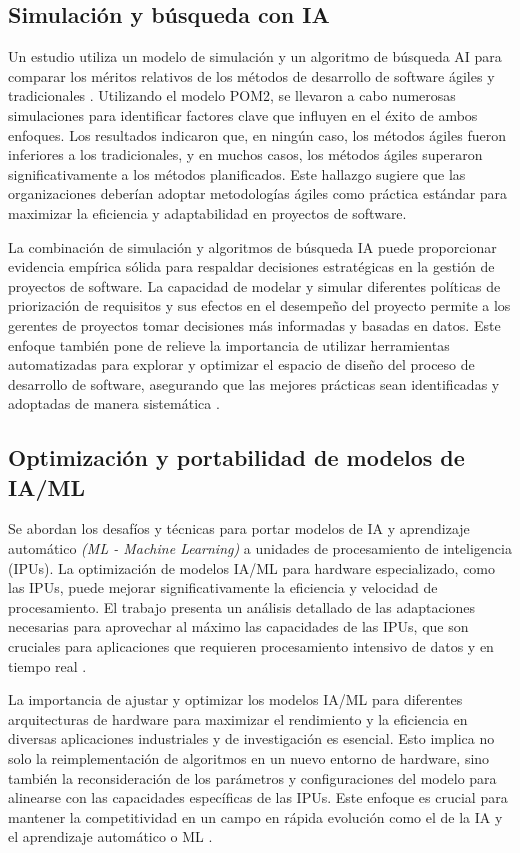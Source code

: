 \subsection{Simulación y búsqueda con IA}

Un estudio utiliza un modelo de simulación y un algoritmo de búsqueda AI para comparar los méritos relativos de los métodos de desarrollo de software ágiles y tradicionales \cite{Lemon2009}. Utilizando el modelo POM2, se llevaron a cabo numerosas simulaciones para identificar factores clave que influyen en el éxito de ambos enfoques. Los resultados indicaron que, en ningún caso, los métodos ágiles fueron inferiores a los tradicionales, y en muchos casos, los métodos ágiles superaron significativamente a los métodos planificados. Este hallazgo sugiere que las organizaciones deberían adoptar metodologías ágiles como práctica estándar para maximizar la eficiencia y adaptabilidad en proyectos de software.

La combinación de simulación y algoritmos de búsqueda IA puede proporcionar evidencia empírica sólida para respaldar decisiones estratégicas en la gestión de proyectos de software. La capacidad de modelar y simular diferentes políticas de priorización de requisitos y sus efectos en el desempeño del proyecto permite a los gerentes de proyectos tomar decisiones más informadas y basadas en datos. Este enfoque también pone de relieve la importancia de utilizar herramientas automatizadas para explorar y optimizar el espacio de diseño del proceso de desarrollo de software, asegurando que las mejores prácticas sean identificadas y adoptadas de manera sistemática \cite{Lemon2009}.

\subsection{Optimización y portabilidad de modelos de IA/ML}

Se abordan los desafíos y técnicas para portar modelos de IA y aprendizaje automático \textit{(ML - Machine Learning)} a unidades de procesamiento de inteligencia (IPUs). La optimización de modelos IA/ML para hardware especializado, como las IPUs, puede mejorar significativamente la eficiencia y velocidad de procesamiento. El trabajo presenta un análisis detallado de las adaptaciones necesarias para aprovechar al máximo las capacidades de las IPUs, que son cruciales para aplicaciones que requieren procesamiento intensivo de datos y en tiempo real \cite{Nasari2023}.

La importancia de ajustar y optimizar los modelos IA/ML para diferentes arquitecturas de hardware para maximizar el rendimiento y la eficiencia en diversas aplicaciones industriales y de investigación es esencial. Esto implica no solo la reimplementación de algoritmos en un nuevo entorno de hardware, sino también la reconsideración de los parámetros y configuraciones del modelo para alinearse con las capacidades específicas de las IPUs. Este enfoque es crucial para mantener la competitividad en un campo en rápida evolución como el de la IA y el aprendizaje automático o ML \cite{Nasari2023}.

